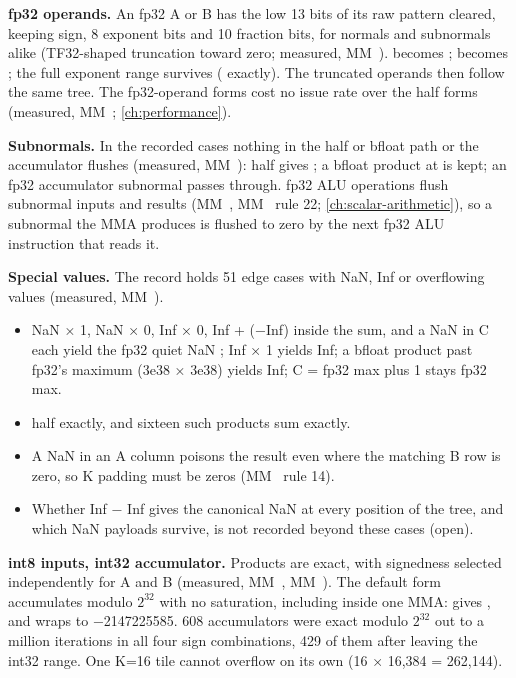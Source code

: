 \textbf{fp32 operands.} An fp32 A or B has the low 13 bits of its raw pattern cleared, keeping sign, 8 exponent bits
and 10 fraction bits, for normals and subnormals alike (TF32-shaped truncation toward zero; measured, MM~).  becomes ;  becomes ; the full exponent
range survives ( exactly). The truncated operands then follow the same tree. The fp32-operand forms
cost no issue rate over the half forms (measured, MM~; \cref{ch:performance}).

\textbf{Subnormals.} In the recorded cases nothing in the half or bfloat path or the accumulator flushes (measured,
MM~): half
 gives ; a bfloat product at  is kept; an fp32 accumulator subnormal passes through. fp32
ALU operations flush subnormal inputs and results (MM~, MM~ rule 22; \cref{ch:scalar-arithmetic}), so a subnormal
the MMA produces is flushed to zero by the next fp32 ALU instruction that reads it.

\textbf{Special values.} The record holds 51 edge cases with NaN, Inf or overflowing values (measured, MM~).

\begin{itemize}
\item NaN × 1, NaN × 0, Inf × 0, Inf + (−Inf) inside the sum, and a NaN in C each yield the fp32 quiet NaN ; Inf × 1 yields Inf; a bfloat product past
  fp32's maximum (3e38 × 3e38) yields Inf; C = fp32 max plus 1 stays fp32 max.
\item half  exactly, and sixteen such products sum exactly.
\item A NaN in an A column poisons the result even where the matching B row is zero, so K padding must be zeros
  (MM~ rule 14).
\item Whether Inf − Inf gives the canonical NaN at every position of the tree, and which NaN payloads survive, is not
  recorded beyond these cases (open).
\end{itemize}

\textbf{int8 inputs, int32 accumulator.} Products are exact, with signedness selected independently for A and B
(measured, MM~, MM~). The default form accumulates modulo $2^{32}$ with no saturation, including inside one MMA:
 gives , and  wraps to −2147225585. 608 accumulators were exact modulo $2^{32}$ out
to a million iterations in all four sign combinations, 429 of them after leaving the int32 range. One K=16 tile cannot
overflow on its own (16 × 16,384 = 262,144).

